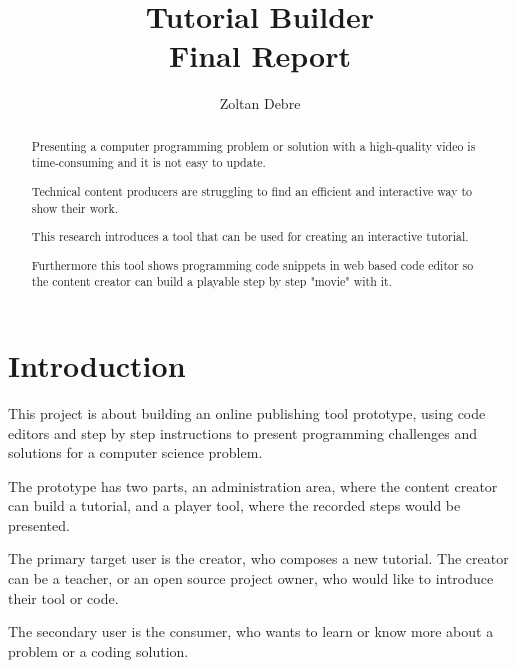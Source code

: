 \documentclass[12pt, a4paper, oneside, openright, medskipamount]{report}
\title{%
Tutorial Builder \\
\large Final Report}
\author{Zoltan Debre}
\begin{document}
\frontmatter



\begin{abstract}

Presenting a computer programming problem or solution with a high-quality video is time-consuming and it is not easy to update.

Technical content producers are struggling to find an efficient and interactive way to show their work.

This research introduces a tool that can be used for creating an interactive tutorial.

Furthermore this tool shows programming code snippets in web based code editor so the content creator can build a playable step by step "movie" with it.

\end{abstract}


\maketitle

\tableofcontents


\mainmatter


\chapter{Introduction}

This project is about building an online publishing tool prototype, using code editors and step by step instructions to present programming challenges and solutions for a computer science problem.

The prototype has two parts, an administration area, where the content creator can build a tutorial, and a player tool, where the recorded steps would be presented.

The primary target user is the creator, who composes a new tutorial. The creator can be a teacher, or an open source project owner, who would like to introduce their tool or code.

The secondary user is the consumer, who wants to learn or know more about a problem or a coding solution.
\end{document}
